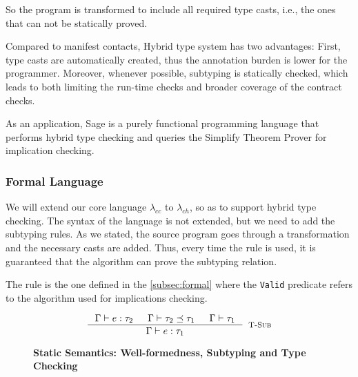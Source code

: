 So the program is transformed to include all required type casts, 
i.e., the ones that can not be statically proved.


Compared to manifest contacts, Hybrid type system has two advantages:
First, type casts are automatically created, thus the annotation burden is lower for
the programmer.
Moreover, whenever possible, subtyping is statically checked, which leads to both
limiting the run-time checks and broader coverage of the contract checks.

As an application, Sage\cite{Gronski06} is 
a purely functional programming language that performs hybrid type checking
and queries the Simplify \cite{Simplify} Theorem Prover for implication checking.

\subsubsection{Formal Language}
We will extend our core language $\lambda_{cc}$ to $\lambda_{ch}$,
so as to support hybrid type checking. 
The syntax of the language is not extended, but we need to add the subtyping rules.
As we stated, the source program goes through a transformation and the necessary casts are added.
Thus, every time the \tsub rule is used, it is guaranteed that the algorithm can prove
the subtyping relation.

The rule \tsub is the one defined in the \ref{subsec:formal}
where the \texttt{Valid} predicate refers to the algorithm used 
for implications checking.

\begin{figure}[ht!]
\medskip {}

$$\begin{array}{cc}

\inference
  {  \hastype{\Gamma}{e}{\tau_2} && \isSubType{\Gamma}{\tau_2}{\tau_1} 
  && \isWellFormed{\Gamma}{\tau_1}
  }
  {\hastype{\Gamma}{e}{\tau_1}}
  [\tsub]
\end{array}$$

\caption{\textbf{Static Semantics: Well-formedness, Subtyping and Type Checking}}
\label{fig:rules}
\end{figure}

 
